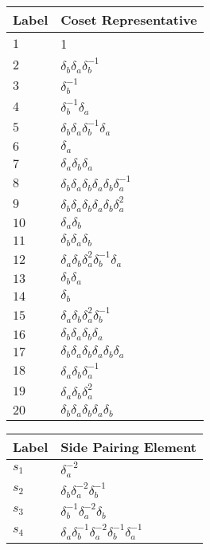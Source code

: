 \documentclass{article}
\begin{document}

\begin{center}
\begin{tabular}{ll}
\toprule
Label & Coset Representative\\
\midrule
$1$ & 1 \\
$2$ & $\delta_b^{}\delta_a^{}\delta_b^{-1}$ \\
$3$ & $\delta_b^{-1}$ \\
$4$ & $\delta_b^{-1}\delta_a^{}$ \\
$5$ & $\delta_b^{}\delta_a^{}\delta_b^{-1}\delta_a^{}$ \\
$6$ & $\delta_a^{}$ \\
$7$ & $\delta_a^{}\delta_b^{}\delta_a^{}$ \\
$8$ & $\delta_b^{}\delta_a^{}\delta_b^{}\delta_a^{}\delta_b^{}\delta_a^{-1}$ \\
$9$ & $\delta_b^{}\delta_a^{}\delta_b^{}\delta_a^{}\delta_b^{}\delta_a^{2}$ \\
$10$ & $\delta_a^{}\delta_b^{}$ \\
$11$ & $\delta_b^{}\delta_a^{}\delta_b^{}$ \\
$12$ & $\delta_a^{}\delta_b^{}\delta_a^{2}\delta_b^{-1}\delta_a^{}$ \\
$13$ & $\delta_b^{}\delta_a^{}$ \\
$14$ & $\delta_b^{}$ \\
$15$ & $\delta_a^{}\delta_b^{}\delta_a^{2}\delta_b^{-1}$ \\
$16$ & $\delta_b^{}\delta_a^{}\delta_b^{}\delta_a^{}$ \\
$17$ & $\delta_b^{}\delta_a^{}\delta_b^{}\delta_a^{}\delta_b^{}\delta_a^{}$ \\
$18$ & $\delta_a^{}\delta_b^{}\delta_a^{-1}$ \\
$19$ & $\delta_a^{}\delta_b^{}\delta_a^{2}$ \\
$20$ & $\delta_b^{}\delta_a^{}\delta_b^{}\delta_a^{}\delta_b^{}$ \\
\bottomrule
\end{tabular}
\hfill
\begin{tabular}{ll}
\toprule
Label & Side Pairing Element\\
\midrule
$s_{1}$ & $\delta_a^{-2}$ \\
$s_{2}$ & $\delta_b^{}\delta_a^{-2}\delta_b^{-1}$ \\
$s_{3}$ & $\delta_b^{-1}\delta_a^{-2}\delta_b^{}$ \\
$s_{4}$ & $\delta_a^{}\delta_b^{-1}\delta_a^{-2}\delta_b^{-1}\delta_a^{-1}$ \\

\end{tabular}
\end{center}
\end{document}
